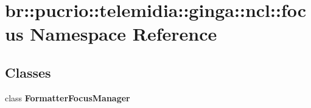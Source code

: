 \section{br::pucrio::telemidia::ginga::ncl::focus Namespace Reference}
\label{namespacebr_1_1pucrio_1_1telemidia_1_1ginga_1_1ncl_1_1focus}


\subsection*{Classes}
\begin{CompactItemize}
\item 
class {\bf FormatterFocusManager}
\end{CompactItemize}
